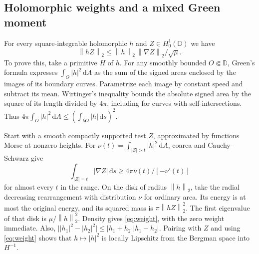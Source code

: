 \documentclass[11pt,a4paper,reqno]{amsart}
\theoremstyle{remark}
\numberwithin{equation}{section}
\newcommand{\dd}{\,\mathrm d}
\newcommand{\norm}[1]{\left\|#1\right\|_2}
\newcommand{\D}{\mathbb D}
\begin{document}
\subsection{Holomorphic weights and a mixed Green moment}
For every square-integrable holomorphic $h$ and $Z\in H_0^1(\D)$ we have
\begin{equation}\label{eq:weight}
                 \norm{hZ}\le\norm h\,\norm{\nabla Z}/\sqrt\mu .
\end{equation}
To prove this, take a primitive $H$ of $h$. For any smoothly bounded
$O\Subset\D$, Green's formula expresses $\int_O|h|^2\dd A$ as the sum of
the signed areas enclosed by the images of its boundary curves. Parametrize
each image by constant speed and subtract its mean. Wirtinger's inequality
bounds the absolute signed area by the square of its length divided by
$4\pi$, including for curves with self-intersections. Thus
$4\pi\int_O|h|^2\dd A\le(\int_{\partial O}|h|\dd s)^2$.

Start with a smooth compactly supported test $Z$, approximated by functions
Morse at nonzero heights. For $\nu(t)=\int_{|Z|>t}|h|^2\dd A$, coarea and
Cauchy--Schwarz give
\[
 \int_{|Z|=t}|\nabla Z|\dd s\ge 4\pi\nu(t)/[-\nu'(t)]
\]
for almost every $t$ in the range. On the disk of radius $\norm h$, take
the radial decreasing rearrangement with distribution $\nu$ for ordinary
area. Its energy is at most the original energy, and its squared mass is
$\pi\norm{hZ}^2$. The first eigenvalue of that disk is $\mu/\norm h^2$.
Density gives \eqref{eq:weight}, with the zero weight immediate. Also,
$\big||h_1|^2-|h_2|^2\big|\le|h_1+h_2||h_1-h_2|$. Pairing with $Z$ and
using \eqref{eq:weight} shows that $h\mapsto|h|^2$ is locally Lipschitz
from the Bergman space into $H^{-1}$.
\end{document}
